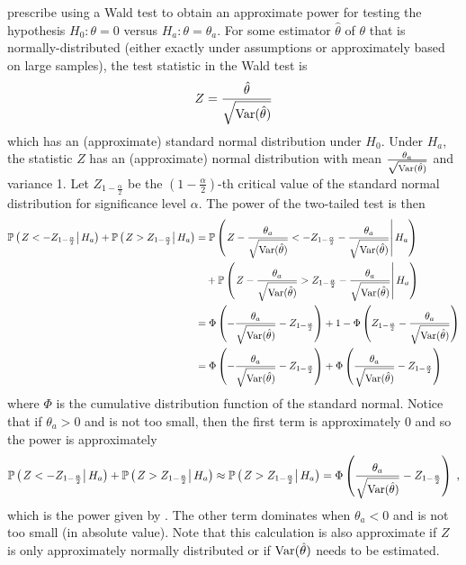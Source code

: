 \documentclass[10pt]{article}
\begin{document}
\textcite{Hussey:2007} prescribe using a Wald test to obtain an approximate power for testing the hypothesis $H_0:\theta=0$ versus $H_a:\theta=\theta_a$. For some estimator $\hat{\theta}$ of $\theta$ that is normally-distributed (either exactly under assumptions or approximately based on large samples), the test statistic in the Wald test is
\[
Z = \frac{\hat{\theta}}{\sqrt{\mathrm{Var}(\hat{\theta})}}
\]
which has an (approximate) standard normal distribution under $H_0$. Under $H_a$, the statistic $Z$ has an (approximate) normal distribution with mean $\frac{\theta_a}{\sqrt{\mathrm{Var}(\hat{\theta})}}$ and variance 1. Let $Z_{1-\frac{\alpha}{2}}$ be the $\left(1-\frac{\alpha}{2}\right)$-th critical value of the standard normal distribution for significance level $\alpha$. The power of the two-tailed test is then
\begin{align*}
\mathbb{P}\left(\left.Z<-Z_{1-\frac{\alpha}{2}}\right|H_a\right) + \mathbb{P}\left(\left.Z>Z_{1-\frac{\alpha}{2}}\right|H_a\right) &= \mathbb{P}\left(\left.Z-\frac{\theta_a}{\sqrt{\mathrm{Var}(\hat{\theta})}}<-Z_{1-\frac{\alpha}{2}}-\frac{\theta_a}{\sqrt{\mathrm{Var}(\hat{\theta})}}\right|H_a\right) \\
&\quad + \mathbb{P}\left(\left.Z-\frac{\theta_a}{\sqrt{\mathrm{Var}(\hat{\theta})}}>Z_{1-\frac{\alpha}{2}}-\frac{\theta_a}{\sqrt{\mathrm{Var}(\hat{\theta})}}\right|H_a\right) \\
&= \Phi\left(-\frac{\theta_a}{\sqrt{\mathrm{Var}(\hat{\theta})}}-Z_{1-\frac{\alpha}{2}}\right) + 1-\Phi\left(Z_{1-\frac{\alpha}{2}}-\frac{\theta_a}{\sqrt{\mathrm{Var}(\hat{\theta})}}\right) \\
&= \Phi\left(-\frac{\theta_a}{\sqrt{\mathrm{Var}(\hat{\theta})}}-Z_{1-\frac{\alpha}{2}}\right) + \Phi\left(\frac{\theta_a}{\sqrt{\mathrm{Var}(\hat{\theta})}} - Z_{1-\frac{\alpha}{2}}\right)
\end{align*}
where $\Phi$ is the cumulative distribution function of the standard normal. Notice that if $\theta_a>0$ and is not too small, then the first term is approximately 0 and so the power is approximately 
\[
\mathbb{P}\left(\left.Z<-Z_{1-\frac{\alpha}{2}}\right|H_a\right) + \mathbb{P}\left(\left.Z>Z_{1-\frac{\alpha}{2}}\right|H_a\right) \approx \mathbb{P}\left(\left.Z>Z_{1-\frac{\alpha}{2}}\right|H_a\right) = \Phi\left(\frac{\theta_a}{\sqrt{\mathrm{Var}(\hat{\theta})}} - Z_{1-\frac{\alpha}{2}}\right) \;,
\]
which is the power given by \textcite{Hussey:2007}. The other term dominates when $\theta_a<0$ and is not too small (in absolute value). Note that this calculation is also approximate if $Z$ is only approximately normally distributed or if $\mathrm{Var}(\hat{\theta})$ needs to be estimated.
\end{document}
